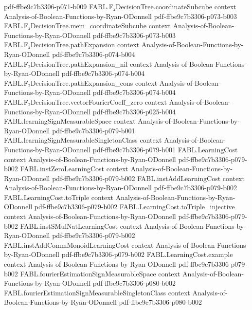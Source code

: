 \begin{theorem}
  {pdf-ffbe9c7b3306-p071-b009}
\proofstep
  {FABL.F₂DecisionTree.coordinateSubcube}
  {context}
  {Analysis-of-Boolean-Functions-by-Ryan-ODonnell}
  {pdf-ffbe9c7b3306-p073-b003}
\proofstep
  {FABL.F₂DecisionTree.mem_coordinateSubcube}
  {context}
  {Analysis-of-Boolean-Functions-by-Ryan-ODonnell}
  {pdf-ffbe9c7b3306-p073-b003}
\proofstep
  {FABL.F₂DecisionTree.pathExpansion}
  {context}
  {Analysis-of-Boolean-Functions-by-Ryan-ODonnell}
  {pdf-ffbe9c7b3306-p074-b004}
\proofstep
  {FABL.F₂DecisionTree.pathExpansion_nil}
  {context}
  {Analysis-of-Boolean-Functions-by-Ryan-ODonnell}
  {pdf-ffbe9c7b3306-p074-b004}
\proofstep
  {FABL.F₂DecisionTree.pathExpansion_cons}
  {context}
  {Analysis-of-Boolean-Functions-by-Ryan-ODonnell}
  {pdf-ffbe9c7b3306-p074-b004}
\proofstep
  {FABL.F₂DecisionTree.vectorFourierCoeff_zero}
  {context}
  {Analysis-of-Boolean-Functions-by-Ryan-ODonnell}
  {pdf-ffbe9c7b3306-p025-b004}
\proofstep
  {FABL.learningSignMeasurableSpace}
  {context}
  {Analysis-of-Boolean-Functions-by-Ryan-ODonnell}
  {pdf-ffbe9c7b3306-p079-b001}
\proofstep
  {FABL.learningSignMeasurableSingletonClass}
  {context}
  {Analysis-of-Boolean-Functions-by-Ryan-ODonnell}
  {pdf-ffbe9c7b3306-p079-b001}
\proofstep
  {FABL.LearningCost}
  {context}
  {Analysis-of-Boolean-Functions-by-Ryan-ODonnell}
  {pdf-ffbe9c7b3306-p079-b002}
\proofstep
  {FABL.instZeroLearningCost}
  {context}
  {Analysis-of-Boolean-Functions-by-Ryan-ODonnell}
  {pdf-ffbe9c7b3306-p079-b002}
\proofstep
  {FABL.instAddLearningCost}
  {context}
  {Analysis-of-Boolean-Functions-by-Ryan-ODonnell}
  {pdf-ffbe9c7b3306-p079-b002}
\proofstep
  {FABL.LearningCost.toTriple}
  {context}
  {Analysis-of-Boolean-Functions-by-Ryan-ODonnell}
  {pdf-ffbe9c7b3306-p079-b002}
\proofstep
  {FABL.LearningCost.toTriple_injective}
  {context}
  {Analysis-of-Boolean-Functions-by-Ryan-ODonnell}
  {pdf-ffbe9c7b3306-p079-b002}
\proofstep
  {FABL.instSMulNatLearningCost}
  {context}
  {Analysis-of-Boolean-Functions-by-Ryan-ODonnell}
  {pdf-ffbe9c7b3306-p079-b002}
\proofstep
  {FABL.instAddCommMonoidLearningCost}
  {context}
  {Analysis-of-Boolean-Functions-by-Ryan-ODonnell}
  {pdf-ffbe9c7b3306-p079-b002}
\proofstep
  {FABL.LearningCost.example}
  {context}
  {Analysis-of-Boolean-Functions-by-Ryan-ODonnell}
  {pdf-ffbe9c7b3306-p079-b002}
\proofstep
  {FABL.fourierEstimationSignMeasurableSpace}
  {context}
  {Analysis-of-Boolean-Functions-by-Ryan-ODonnell}
  {pdf-ffbe9c7b3306-p080-b002}
\proofstep
  {FABL.fourierEstimationSignMeasurableSingletonClass}
  {context}
  {Analysis-of-Boolean-Functions-by-Ryan-ODonnell}
  {pdf-ffbe9c7b3306-p080-b002}

\end{theorem}
